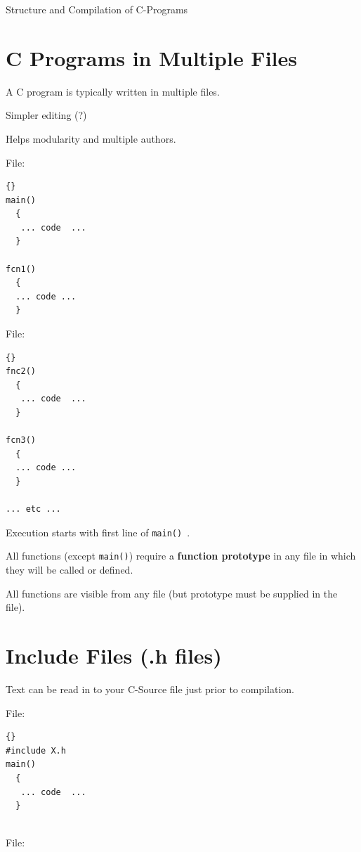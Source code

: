 \documentclass{article}	%
\begin{document}

\begin{center}
{\Large Structure and Compilation of C-Programs}
\end{center}


\section{C Programs in Multiple Files}

A C program is typically written in multiple files.

Simpler editing (?)

Helps modularity and multiple authors.

    
File: 
\lstset{language=c}
\lstset{basicstyle=\ttfamily, commentstyle=\textit}
\begin{lstlisting}[frame=trbl]{}
main()
  {
   ... code  ...
  }

fcn1()
  {
  ... code ...
  }
\end{lstlisting}


File: 

\lstset{language=c}
\lstset{basicstyle=\ttfamily, commentstyle=\textit}
\begin{lstlisting}[frame=trbl]{}
fnc2()
  {
   ... code  ...
  }

fcn3()
  {
  ... code ...
  }

... etc ...
\end{lstlisting}



Execution starts with first line of {\tt main() }.

All functions (except {\tt main()}) require a {\bf function prototype}
in any file in which they will be called or defined. 

All functions are visible from any file (but prototype must be supplied in the file).

\section{Include Files (.h files)}
Text can be read in to your C-Source file just prior to compilation. 

File: 

\lstset{language=c}
\lstset{basicstyle=\ttfamily, commentstyle=\textit}
\begin{lstlisting}[frame=trbl]{}
#include X.h
main()
  {
   ... code  ...
  }
 
\end{lstlisting}
File: 
\end{document}
